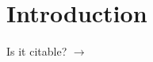 \documentclass[./main]{subfiles}
\begin{document}
\section{Introduction}
Is it citable? $\to$ \citet{Haxby2425}

\end{document}
